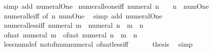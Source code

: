 \begin{isabellebody}
\ {\isacharparenleft}{\kern0pt}simp\ add{\isacharcolon}{\kern0pt}\ numeral{\isacharunderscore}{\kern0pt}One{\isacharparenright}{\kern0pt}%
\endisatagproof
{\isafoldproof}%
%
\isadelimproof
\isanewline
%
\endisadelimproof
\isanewline
{}\isamarkupfalse%
\ numeral{\isacharunderscore}{\kern0pt}le{\isacharunderscore}{\kern0pt}one{\isacharunderscore}{\kern0pt}iff{\isacharcolon}{\kern0pt}\ {\isachardoublequoteopen}numeral\ n\ {\isasymle}\ {}\ {\isasymlongleftrightarrow}\ n\ {\isasymle}\ num{\isachardot}{\kern0pt}One{\isachardoublequoteclose}\isanewline
%
\isadelimproof
\ \ %
\endisadelimproof
%
\isatagproof
{}\isamarkupfalse%
\ numeral{\isacharunderscore}{\kern0pt}le{\isacharunderscore}{\kern0pt}iff\ {\isacharbrackleft}{\kern0pt}of\ n\ num{\isachardot}{\kern0pt}One{\isacharbrackright}{\kern0pt}\ \isamarkupfalse%
\ {\isacharparenleft}{\kern0pt}simp\ add{\isacharcolon}{\kern0pt}\ numeral{\isacharunderscore}{\kern0pt}One{\isacharparenright}{\kern0pt}%
\endisatagproof
{\isafoldproof}%
%
\isadelimproof
\isanewline
%
\endisadelimproof
\isanewline
{}\isamarkupfalse%
\ numeral{\isacharunderscore}{\kern0pt}less{\isacharunderscore}{\kern0pt}iff{\isacharcolon}{\kern0pt}\ {\isachardoublequoteopen}numeral\ m\ {\isacharless}{\kern0pt}\ numeral\ n\ {\isasymlongleftrightarrow}\ m\ {\isacharless}{\kern0pt}\ n{\isachardoublequoteclose}\isanewline
%
\isadelimproof
%
\endisadelimproof
%
\isatagproof
{}\isamarkupfalse%
\ {\isacharminus}{\kern0pt}\isanewline
\ \ \isamarkupfalse%
\ {\isachardoublequoteopen}of{\isacharunderscore}{\kern0pt}nat\ {\isacharparenleft}{\kern0pt}numeral\ m{\isacharparenright}{\kern0pt}\ {\isacharless}{\kern0pt}\ of{\isacharunderscore}{\kern0pt}nat\ {\isacharparenleft}{\kern0pt}numeral\ n{\isacharparenright}{\kern0pt}\ {\isasymlongleftrightarrow}\ m\ {\isacharless}{\kern0pt}\ n{\isachardoublequoteclose}\isanewline
\ \ \ \ \isamarkupfalse%
\ less{\isacharunderscore}{\kern0pt}num{\isacharunderscore}{\kern0pt}def\ nat{\isacharunderscore}{\kern0pt}of{\isacharunderscore}{\kern0pt}num{\isacharunderscore}{\kern0pt}numeral\ of{\isacharunderscore}{\kern0pt}nat{\isacharunderscore}{\kern0pt}less{\isacharunderscore}{\kern0pt}iff\ \isacommand{{\isachardot}{\kern0pt}{\isachardot}{\kern0pt}}\isamarkupfalse%
\isanewline
\ \ \isamarkupfalse%
\ \isamarkupfalse%
\ {\isacharquery}{\kern0pt}thesis\ \isamarkupfalse%
\ simp\isanewline
{}\isamarkupfalse%
%
\endisatagproof
{\isafoldproof}%
%
\isadelimproof

\end{isabellebody}
